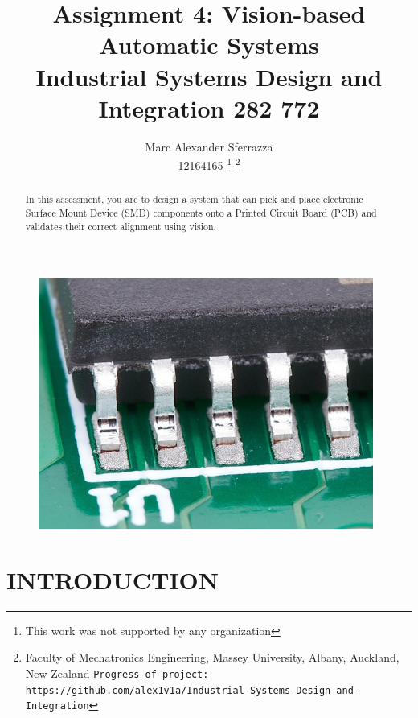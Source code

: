 \documentclass[a4paper, 10pt]{IEEEconf}
\title{\LARGE \bf Assignment 4: Vision-based Automatic Systems\\Industrial Systems Design and Integration 282 772}
\author{Marc Alexander Sferrazza \\ 12164165
\thanks{This work was not supported by any organization}
\thanks{Faculty of Mechatronics Engineering, Massey University, Albany, Auckland, New Zealand
        {\tt\small Progress of project: https://github.com/alex1v1a/Industrial-Systems-Design-and-Integration} } }
\begin{document}
\maketitle
\begin{figure}[H]
  \begin{center}
  \includegraphics[width=110mm]{images/match}
  \label{fig:kinetic}
  \end{center}
\end{figure}
\thispagestyle{empty}
\pagestyle{plain}



\begin{abstract}
In this assessment, you are to design a system that can pick and place electronic Surface Mount Device (SMD) components onto a Printed Circuit Board (PCB) and validates their correct alignment using vision.

\end{abstract}


 

\clearpage
\setcounter{page}{1}
\onecolumn

\section{INTRODUCTION}
\end{document}
